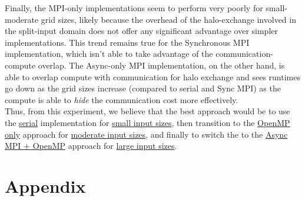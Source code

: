 \documentclass[a4paper,10pt]{article}
\begin{document}
Finally, the MPI-only implementations seem to perform very poorly for small-moderate grid sizes, likely because the overhead of the halo-exchange involved in the split-input domain does not offer any significant advantage over simpler implementations. This trend remains true for the Synchronous MPI implementation, which isn't able to take advantage of the communication-compute overlap. The Async-only MPI implementation, on the other hand, is able to overlap compute with communication for halo exchange and sees runtimes go down as the grid sizes increase (compared to serial and Sync MPI) as the compute is able to \textit{hide} the communication cost more effectively. \\

Thus, from this experiment, we believe that the best approach would be to use the \underline{serial} implementation for \underline{small input sizes}, then transition to the \underline{OpenMP only} approach for \underline{moderate input sizes}, and finally to switch the to the \underline{Async MPI + OpenMP} approach for \underline{large input sizes}. 

\section{Appendix}
\end{document}
